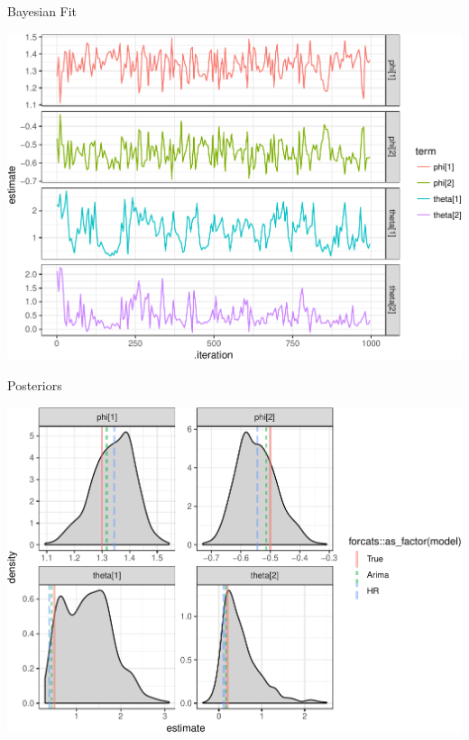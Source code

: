 \documentclass[11pt,ignorenonframetext,]{beamer}
\begin{document}
\begin{frame}{%
\protect\hypertarget{bayesian-fit}{%
Bayesian Fit}}

\begin{center}\includegraphics[width=\textwidth]{Lec10_files/figure-beamer/unnamed-chunk-24-1} \end{center}

\end{frame}

\begin{frame}{%
\protect\hypertarget{posteriors-1}{%
Posteriors}}

\begin{center}\includegraphics[width=\textwidth]{Lec10_files/figure-beamer/unnamed-chunk-25-1} \end{center}

\end{frame}
\end{document}
